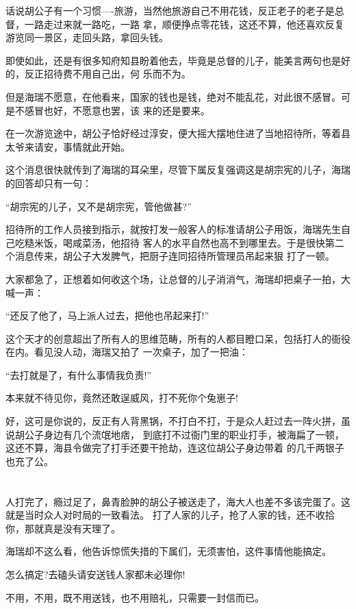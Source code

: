\documentclass[11pt,a4paper,onecolumn]{article}
\begin{document}
话说胡公子有一个习惯----旅游，当然他旅游自己不用花钱，反正老子的老子是总督，一路走过来就一路吃，一路
拿，顺便挣点零花钱，这还不算，他还喜欢反复游览同一景区，走回头路，拿回头钱。

即使如此，还是有很多知府知县盼着他去，毕竟是总督的儿子，能美言两句也是好的，反正招待费不用自己出，何
乐而不为。

但是海瑞不愿意，在他看来，国家的钱也是钱，绝对不能乱花，对此很不感冒。可是不感冒也好，不愿意也罢，该
来的还是要来。

在一次游览途中，胡公子恰好经过淳安，便大摇大摆地住进了当地招待所，等着县太爷来请安，事情就此开始。

这个消息很快就传到了海瑞的耳朵里，尽管下属反复强调这是胡宗宪的儿子，海瑞的回答却只有一句：

``胡宗宪的儿子，又不是胡宗宪，管他做甚?''

招待所的工作人员接到指示，就按打发一般客人的标准请胡公子用饭，海瑞先生自己吃糙米饭，喝咸菜汤，他招待
客人的水平自然也高不到哪里去。于是很快第二个消息传来，胡公子大发脾气，把厨子连同招待所管理员吊起来狠
打了一顿。

大家都急了，正想着如何收这个场，让总督的儿子消消气，海瑞却把桌子一拍，大喊一声：

``还反了他了，马上派人过去，把他也吊起来打!''

这个天才的创意超出了所有人的思维范畴，所有的人都目瞪口呆，包括打人的衙役在内。看见没人动，海瑞又拍了
一次桌子，加了一把油：

``去打就是了，有什么事情我负责!''

本来就不待见你，竟然还敢逞威风，打不死你个兔崽子!

好，这可是你说的，反正有人背黑锅，不打白不打，于是众人赶过去一阵火拼，虽说胡公子身边有几个流氓地痞，
到底打不过衙门里的职业打手，被海扁了一顿，这还不算，海县令做完了打手还要干抢劫，连这位胡公子身边带着
的几千两银子也充了公。

\section[\thesection]{}

人打完了，瘾过足了，鼻青脸肿的胡公子被送走了，海大人也差不多该完蛋了。这就是当时众人对时局的一致看法。
打了人家的儿子，抢了人家的钱，还不收拾你，那就真是没有天理了。

海瑞却不这么看，他告诉惊慌失措的下属们，无须害怕，这件事情他能搞定。

怎么搞定?去磕头请安送钱人家都未必理你!

不用，不用，既不用送钱，也不用赔礼，只需要一封信而已。
\end{document}

